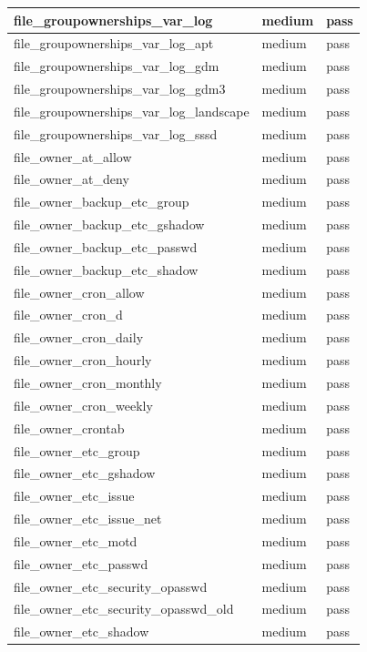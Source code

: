 \begin{longtable}{|p{10cm}|p{2cm}|p{2cm}|}
\hline
file\_groupownerships\_var\_log & medium & pass \\
\hline
file\_groupownerships\_var\_log\_apt & medium & pass \\
\hline
file\_groupownerships\_var\_log\_gdm & medium & pass \\
\hline
file\_groupownerships\_var\_log\_gdm3 & medium & pass \\
\hline
file\_groupownerships\_var\_log\_landscape & medium & pass \\
\hline
file\_groupownerships\_var\_log\_sssd & medium & pass \\
\hline
file\_owner\_at\_allow & medium & pass \\
\hline
file\_owner\_at\_deny & medium & pass \\
\hline
file\_owner\_backup\_etc\_group & medium & pass \\
\hline
file\_owner\_backup\_etc\_gshadow & medium & pass \\
\hline
file\_owner\_backup\_etc\_passwd & medium & pass \\
\hline
file\_owner\_backup\_etc\_shadow & medium & pass \\
\hline
file\_owner\_cron\_allow & medium & pass \\
\hline
file\_owner\_cron\_d & medium & pass \\
\hline
file\_owner\_cron\_daily & medium & pass \\
\hline
file\_owner\_cron\_hourly & medium & pass \\
\hline
file\_owner\_cron\_monthly & medium & pass \\
\hline
file\_owner\_cron\_weekly & medium & pass \\
\hline
file\_owner\_crontab & medium & pass \\
\hline
file\_owner\_etc\_group & medium & pass \\
\hline
file\_owner\_etc\_gshadow & medium & pass \\
\hline
file\_owner\_etc\_issue & medium & pass \\
\hline
file\_owner\_etc\_issue\_net & medium & pass \\
\hline
file\_owner\_etc\_motd & medium & pass \\
\hline
file\_owner\_etc\_passwd & medium & pass \\
\hline
file\_owner\_etc\_security\_opasswd & medium & pass \\
\hline
file\_owner\_etc\_security\_opasswd\_old & medium & pass \\
\hline
file\_owner\_etc\_shadow & medium & pass \\

\end{longtable}
